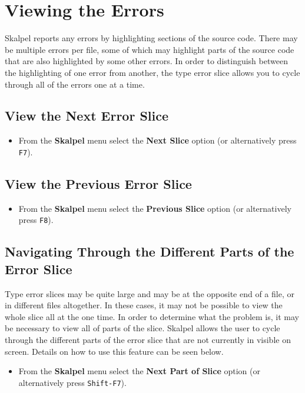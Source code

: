\documentclass{report}
\begin{document}
\section{Viewing the Errors}

Skalpel reports any errors by highlighting sections of
the source code. There may be multiple errors per file, some of which
may highlight parts of the source code that are also highlighted by
some other errors. In order to distinguish between the highlighting
of one error from another, the type error slice allows you to cycle
through all of the errors one at a time.

\subsection{View the Next Error Slice}

\begin{itemize}
\item From the \textbf{Skalpel} menu select the \textbf{Next Slice}
  option (or alternatively press \texttt{F7}).
\end{itemize}

\subsection{View the Previous Error Slice}

\begin{itemize}
\item From the \textbf{Skalpel} menu select the \textbf{Previous Slice}
  option (or alternatively press \texttt{F8}).
\end{itemize}

\subsection{Navigating Through the Different Parts of the Error Slice}
Type error slices may be quite large and may be at the opposite end of
a file, or in different files altogether. In these cases, it may not
be possible to view the whole slice all at the one time. In order to
determine what the problem is, it may be necessary to view all of
parts of the slice. Skalpel allows the user to cycle
through the different parts of the error slice that are not currently
in visible on screen. Details on how to use this feature can be seen below.

\begin{itemize}
\item From the \textbf{Skalpel} menu select the \textbf{Next Part of
  Slice} option (or alternatively press \texttt{Shift-F7}).
\end{itemize}
\end{document}

